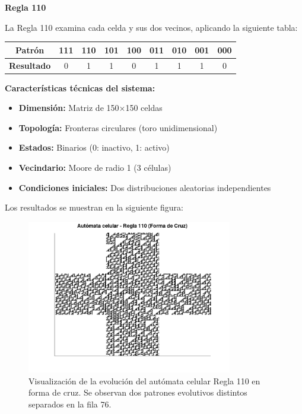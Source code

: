 \documentclass[a4paper,12pt]{article}
\theoremstyle{mytheor}
\begin{document}
\textbf{Regla 110}

La Regla 110 examina cada celda y sus dos vecinos, aplicando la siguiente tabla:

\begin{center}
\begin{tabular}{|c|c|c|c|c|c|c|c|c|}
\hline
\textbf{Patrón} & 111 & 110 & 101 & 100 & 011 & 010 & 001 & 000 \\
\hline
\textbf{Resultado} & 0 & 1 & 1 & 0 & 1 & 1 & 1 & 0 \\
\hline
\end{tabular}
\end{center}

\textbf{Características técnicas del sistema:}
\begin{itemize}
    \item \textbf{Dimensión:} Matriz de 150×150 celdas
    \item \textbf{Topología:} Fronteras circulares (toro unidimensional)
    \item \textbf{Estados:} Binarios (0: inactivo, 1: activo)
    \item \textbf{Vecindario:} Moore de radio 1 (3 células)
    \item \textbf{Condiciones iniciales:} Dos distribuciones aleatorias independientes
\end{itemize}

Los resultados se muestran en la siguiente figura:

\begin{figure}[H]
    \centering
    \includegraphics[width=0.8\textwidth]{g13.png}
    \caption{Visualización de la evolución del autómata celular Regla 110 en forma de cruz. Se observan dos patrones evolutivos distintos separados en la fila 76.}
    \label{fig:automata_resultado}
\end{figure}
\end{document}

